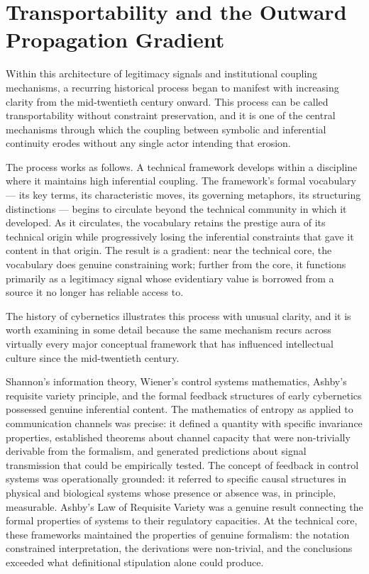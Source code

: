 \documentclass[12pt, openright, twoside]{book}
\begin{document}
\section{Transportability and the Outward Propagation Gradient}

Within this architecture of legitimacy signals and institutional coupling
mechanisms, a recurring historical process began to manifest with increasing
clarity from the mid-twentieth century onward. This process can be called
transportability without constraint preservation, and it is one of the central
mechanisms through which the coupling between symbolic and inferential
continuity erodes without any single actor intending that erosion.

The process works as follows. A technical framework develops within a discipline
where it maintains high inferential coupling. The framework's formal vocabulary
--- its key terms, its characteristic moves, its governing metaphors, its
structuring distinctions --- begins to circulate beyond the technical community
in which it developed. As it circulates, the vocabulary retains the prestige
aura of its technical origin while progressively losing the inferential
constraints that gave it content in that origin. The result is a gradient:
near the technical core, the vocabulary does genuine constraining work; further
from the core, it functions primarily as a legitimacy signal whose evidentiary
value is borrowed from a source it no longer has reliable access to.

The history of cybernetics illustrates this process with unusual clarity, and
it is worth examining in some detail because the same mechanism recurs across
virtually every major conceptual framework that has influenced intellectual
culture since the mid-twentieth century.

Shannon's information theory, Wiener's control systems mathematics, Ashby's
requisite variety principle, and the formal feedback structures of early
cybernetics possessed genuine inferential content. The mathematics of entropy
as applied to communication channels was precise: it defined a quantity with
specific invariance properties, established theorems about channel capacity
that were non-trivially derivable from the formalism, and generated predictions
about signal transmission that could be empirically tested. The concept of
feedback in control systems was operationally grounded: it referred to specific
causal structures in physical and biological systems whose presence or absence
was, in principle, measurable. Ashby's Law of Requisite Variety was a genuine
result connecting the formal properties of systems to their regulatory
capacities. At the technical core, these frameworks maintained the properties
of genuine formalism: the notation constrained interpretation, the derivations
were non-trivial, and the conclusions exceeded what definitional stipulation
alone could produce.
\end{document}
